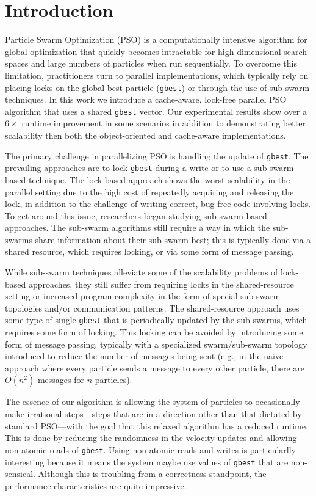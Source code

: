 \section{Introduction}
Particle Swarm Optimization (PSO)\cite{pso} is a computationally intensive algorithm for
global optimization that quickly becomes intractable for
high-dimensional search spaces and large numbers of particles when run
sequentially. To overcome this limitation, practitioners turn to parallel
implementations, which typically rely on placing locks on the global best
particle (\texttt{gbest}) or through the use of sub-swarm techniques. In this
work we introduce a cache-aware, lock-free parallel PSO algorithm that uses a
shared \texttt{gbest} vector. Our experimental results show over a $6\times$
runtime improvement in some scenarios in addition to demonstrating better
scalability then both the object-oriented and cache-aware implementations.

The primary challenge in parallelizing PSO is handling the update of
\texttt{gbest}. The prevailing approaches are to lock \texttt{gbest} during a
write or to use a sub-swarm based technique. The lock-based approach shows the
worst scalability in the parallel setting due to the high cost of repeatedly
acquiring and releasing the lock, in addition to the challenge of writing
correct, bug-free code involving locks. To get around this issue, researchers began
studying sub-swarm-based approaches. The sub-swarm algorithms still require a
way in which the sub-swarms share information about their sub-swarm best; this
is typically done via a shared resource, which requires locking, or via some
form of message passing.

While sub-swarm techniques alleviate some of the scalability problems of
lock-based approaches, they still suffer from requiring locks in the
shared-resource setting
or increased program complexity in the form of special sub-swarm topologies
and/or communication patterns. The shared-resource approach uses some type of
single \texttt{gbest} that is periodically updated by the sub-swarms, which
requires some form of locking. This locking can be avoided by introducing some
form of message passing, typically with a specialized swarm/sub-swarm topology
introduced to reduce the number of messages being sent (e.g., in the naive
approach where every particle sends a message to every other particle, there are
$O(n^2)$ messages for $n$ particles).

The essence of our algorithm is allowing the system of particles to occasionally
make irrational steps---steps that are in a direction other than that dictated by
standard PSO---with the goal that this relaxed algorithm has a reduced runtime.
This is done by reducing the randomness in the velocity updates and
allowing non-atomic reads of \texttt{gbest}. Using non-atomic reads and writes
is particularlly interesting because it means the system maybe use values of
\texttt{gbest} that are non-sensical. Although this is troubling from a
correctness standpoint, the performance characteristics are quite impressive.

